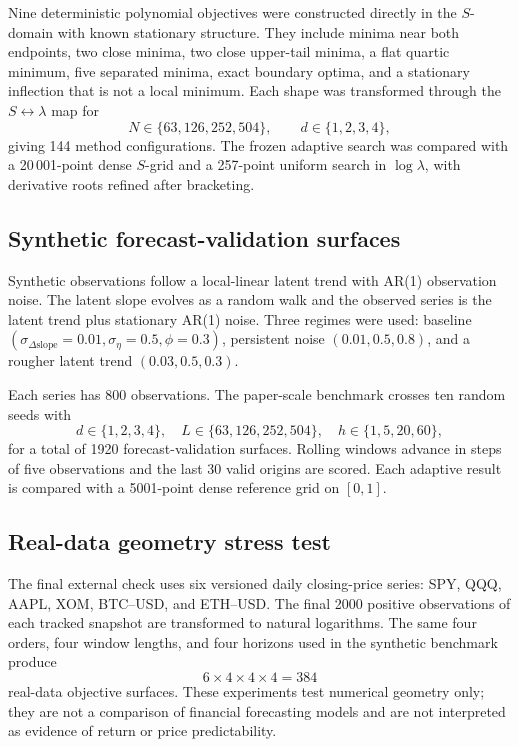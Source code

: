 \documentclass[english]{smcca}
\begin{document}
Nine deterministic polynomial objectives were constructed directly in the \(S\)-domain with known stationary structure. They include minima near both endpoints, two close minima, two close upper-tail minima, a flat quartic minimum, five separated minima, exact boundary optima, and a stationary inflection that is not a local minimum. Each shape was transformed through the \(S\leftrightarrow\lambda\) map for
\[
N\in\{63,126,252,504\},
\qquad
d\in\{1,2,3,4\},
\]
giving 144 method configurations. The frozen adaptive search was compared with a 20\,001-point dense \(S\)-grid and a 257-point uniform search in \(\log\lambda\), with derivative roots refined after bracketing.

\subsection{Synthetic forecast-validation surfaces}

Synthetic observations follow a local-linear latent trend with AR(1) observation noise. The latent slope evolves as a random walk and the observed series is the latent trend plus stationary AR(1) noise. Three regimes were used: baseline \((\sigma_{\Delta\text{slope}}=0.01,\sigma_\eta=0.5,\phi=0.3)\), persistent noise \((0.01,0.5,0.8)\), and a rougher latent trend \((0.03,0.5,0.3)\).

Each series has 800 observations. The paper-scale benchmark crosses ten random seeds with
\[
d\in\{1,2,3,4\},\quad
L\in\{63,126,252,504\},\quad
h\in\{1,5,20,60\},
\]
for a total of 1920 forecast-validation surfaces. Rolling windows advance in steps of five observations and the last 30 valid origins are scored. Each adaptive result is compared with a 5001-point dense reference grid on \([0,1]\).

\subsection{Real-data geometry stress test}

The final external check uses six versioned daily closing-price series: SPY, QQQ, AAPL, XOM, BTC--USD, and ETH--USD. The final 2000 positive observations of each tracked snapshot are transformed to natural logarithms. The same four orders, four window lengths, and four horizons used in the synthetic benchmark produce
\[
6\times4\times4\times4=384
\]
real-data objective surfaces. These experiments test numerical geometry only; they are not a comparison of financial forecasting models and are not interpreted as evidence of return or price predictability.
\end{document}
